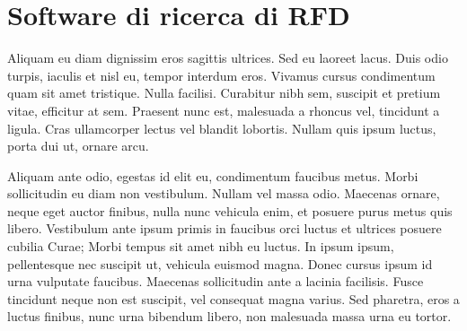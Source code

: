 \section{Software di ricerca di RFD}
Aliquam eu diam dignissim eros sagittis ultrices. Sed eu laoreet lacus. Duis odio turpis, iaculis et nisl eu, tempor interdum eros. Vivamus cursus condimentum quam sit amet tristique. Nulla facilisi. Curabitur nibh sem, suscipit et pretium vitae, efficitur at sem. Praesent nunc est, malesuada a rhoncus vel, tincidunt a ligula. Cras ullamcorper lectus vel blandit lobortis. Nullam quis ipsum luctus, porta dui ut, ornare arcu.

Aliquam ante odio, egestas id elit eu, condimentum faucibus metus. Morbi sollicitudin eu diam non vestibulum. Nullam vel massa odio. Maecenas ornare, neque eget auctor finibus, nulla nunc vehicula enim, et posuere purus metus quis libero. Vestibulum ante ipsum primis in faucibus orci luctus et ultrices posuere cubilia Curae; Morbi tempus sit amet nibh eu luctus. In ipsum ipsum, pellentesque nec suscipit ut, vehicula euismod magna. Donec cursus ipsum id urna vulputate faucibus. Maecenas sollicitudin ante a lacinia facilisis. Fusce tincidunt neque non est suscipit, vel consequat magna varius. Sed pharetra, eros a luctus finibus, nunc urna bibendum libero, non malesuada massa urna eu tortor.